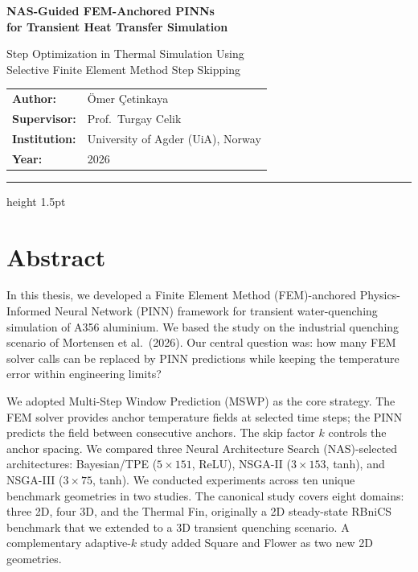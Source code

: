 \documentclass[a4paper,11pt]{article}
\begin{document}
\begin{center}
{\LARGE\bfseries\color{uiablue}
NAS-Guided FEM-Anchored PINNs\\[4pt]
for Transient Heat Transfer Simulation}

\vspace{4pt}
{\large\color{darkgrey}
Step Optimization in Thermal Simulation Using\\
Selective Finite Element Method Step Skipping}

\vspace{10pt}
\begin{tabular}{ll}
\textbf{Author:}     & Ömer Çetinkaya \\
\textbf{Supervisor:} & Prof.\ Turgay Celik \\
\textbf{Institution:} & University of Agder (UiA), Norway \\
\textbf{Year:}       & 2026 \\
\end{tabular}
\end{center}

\vspace{6pt}
\hrule height 1.5pt
\vspace{10pt}

\section*{Abstract}

In this thesis, we developed a Finite Element Method (FEM)-anchored
Physics-Informed Neural Network (PINN) framework for transient water-quenching
simulation of A356 aluminium.
We based the study on the industrial quenching scenario of Mortensen et al.\ (2026).
Our central question was: how many FEM solver calls can be replaced by PINN
predictions while keeping the temperature error within engineering limits?

We adopted Multi-Step Window Prediction (MSWP) as the core strategy.
The FEM solver provides anchor temperature fields at selected time steps; the
PINN predicts the field between consecutive anchors.
The skip factor $k$ controls the anchor spacing.
We compared three Neural Architecture Search (NAS)-selected architectures:
Bayesian/TPE ($5{\times}151$, ReLU), NSGA-II ($3{\times}153$, tanh), and
NSGA-III ($3{\times}75$, tanh).
We conducted experiments across ten unique benchmark geometries in two studies.
The canonical study covers eight domains: three 2D, four 3D, and the Thermal Fin,
originally a 2D steady-state RBniCS benchmark that we extended to a 3D
transient quenching scenario.
A complementary adaptive-$k$ study added Square and Flower as two new 2D geometries.
\end{document}
